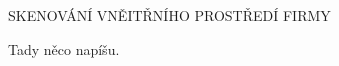 \begin{lefttextpipe}
	{\Large \MakeUppercase{} SKENOVÁNÍ VNĚITŘNÍHO PROSTŘEDÍ FIRMY}
\end{lefttextpipe}

Tady něco napíšu.